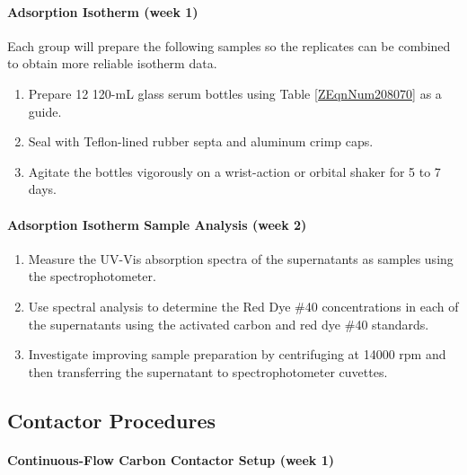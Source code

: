 \documentclass{article} %
\begin{document}
\paragraph{Adsorption Isotherm (week 1)}

Each group will prepare the following samples so the replicates can be combined to obtain more reliable isotherm data.

\begin{enumerate}
\item  Prepare 12 120-mL glass serum bottles using Table \eqref{ZEqnNum208070} as a guide.

\item  Seal with Teflon-lined rubber septa and aluminum crimp caps.

\item  Agitate the bottles vigorously on a wrist-action or orbital shaker for 5 to 7 days. 
\end{enumerate}

\noindent 
\paragraph{Adsorption Isotherm Sample Analysis (week 2)}

\begin{enumerate}
\item \textbf{ }Measure the UV-Vis absorption spectra of the supernatants as samples using the spectrophotometer.

\item  Use spectral analysis to determine the Red Dye \#40 concentrations in each of the supernatants using the activated carbon and red dye \#40 standards.

\item  Investigate improving sample preparation by centrifuging at 14000 rpm and then transferring the supernatant to spectrophotometer cuvettes.
\end{enumerate}

\noindent 
\subsection{Contactor Procedures}

\noindent 
\paragraph{Continuous-Flow Carbon Contactor Setup (week 1)}
\end{document}
